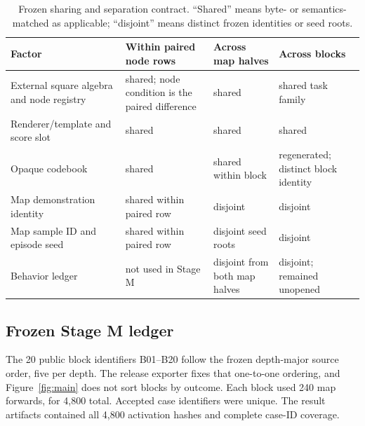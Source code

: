 \documentclass[10pt,a4paper]{article}
\begin{document}
\begin{table}[H]
\centering
\scriptsize
\caption{Frozen sharing and separation contract. ``Shared'' means byte- or semantics-matched as applicable; ``disjoint'' means distinct frozen identities or seed roots.}
\label{tab:separation-contract}
\begin{tabularx}{\textwidth}{@{}Yp{35mm}p{35mm}p{35mm}@{}}
\toprule
Factor & Within paired node rows & Across map halves & Across blocks \\
\midrule
External square algebra and node registry & shared; node condition is the paired difference & shared & shared task family \\
Renderer/template and score slot & shared & shared & shared \\
Opaque codebook & shared & shared within block & regenerated; distinct block identity \\
Map demonstration identity & shared within paired row & disjoint & disjoint \\
Map sample ID and episode seed & shared within paired row & disjoint seed roots & disjoint \\
Behavior ledger & not used in Stage M & disjoint from both map halves & disjoint; remained unopened \\
\bottomrule
\end{tabularx}
\end{table}

\subsection{Frozen Stage M ledger}

The 20 public block identifiers B01--B20 follow the frozen depth-major source order, five per depth. The release exporter fixes that one-to-one ordering, and Figure~\ref{fig:main} does not sort blocks by outcome. Each block used 240 map forwards, for 4,800 total. Accepted case identifiers were unique. The result artifacts contained all 4,800 activation hashes and complete case-ID coverage.
\end{document}

